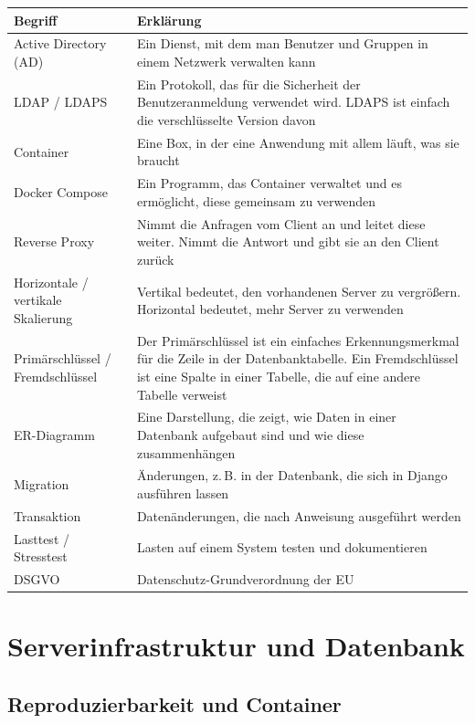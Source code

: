 \begin{center}
\begin{tabular}{|p{4.2cm}|p{9.5cm}|}
\hline
\textbf{Begriff} & \textbf{Erklärung} \\ \hline
Active Directory (AD) & Ein Dienst, mit dem man Benutzer und Gruppen in einem Netzwerk verwalten kann \\ \hline
LDAP / LDAPS & Ein Protokoll, das für die Sicherheit der Benutzeranmeldung verwendet wird. LDAPS ist einfach die verschlüsselte Version davon \\ \hline
Container & Eine Box, in der eine Anwendung mit allem läuft, was sie braucht \\ \hline
Docker Compose & Ein Programm, das Container verwaltet und es ermöglicht, diese gemeinsam zu verwenden \\ \hline
Reverse Proxy & Nimmt die Anfragen vom Client an und leitet diese weiter. Nimmt die Antwort und gibt sie an den Client zurück \\ \hline
Horizontale / vertikale Skalierung & Vertikal bedeutet, den vorhandenen Server zu vergrößern. Horizontal bedeutet, mehr Server zu verwenden \\ \hline
Primärschlüssel / Fremdschlüssel & Der Primärschlüssel ist ein einfaches Erkennungsmerkmal für die Zeile in der Datenbanktabelle. Ein Fremdschlüssel ist eine Spalte in einer Tabelle, die auf eine andere Tabelle verweist \\ \hline
ER-Diagramm & Eine Darstellung, die zeigt, wie Daten in einer Datenbank aufgebaut sind und wie diese zusammenhängen \\ \hline
Migration & Änderungen, z.\,B. in der Datenbank, die sich in Django ausführen lassen \\ \hline
Transaktion & Datenänderungen, die nach Anweisung ausgeführt werden \\ \hline
Lasttest / Stresstest & Lasten auf einem System testen und dokumentieren \\ \hline
DSGVO & Datenschutz-Grundverordnung der EU \\ \hline
\end{tabular}
\end{center}
 
\section{Serverinfrastruktur und Datenbank}
 
\subsection{Reproduzierbarkeit und Container}
 
